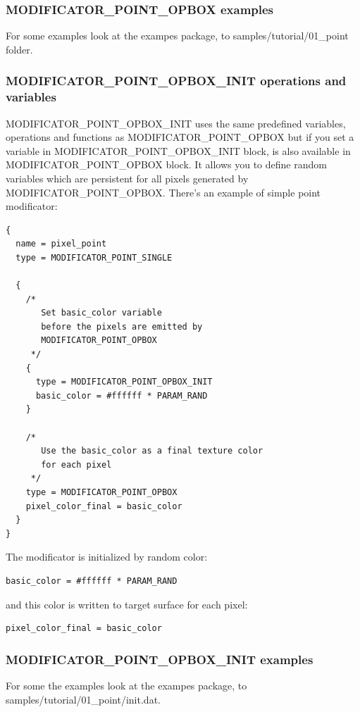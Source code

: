 \documentclass[9pt]{article}
\begin{document}
\subsubsection*{MODIFICATOR\_POINT\_OPBOX examples}

For some examples look at the exampes package, to samples/tutorial/01\_point folder.

\subsubsection*{MODIFICATOR\_POINT\_OPBOX\_INIT operations and variables}

MODIFICATOR\_POINT\_OPBOX\_INIT uses the same predefined variables, operations 
and functions as MODIFICATOR\_POINT\_OPBOX but if you set a variable in 
MODIFICATOR\_POINT\_OPBOX\_INIT block, is also available in 
MODIFICATOR\_POINT\_OPBOX block. It allows you to define random 
variables which are persistent for all pixels generated by MODIFICATOR\_POINT\_OPBOX. 
There's an example of simple point modificator:

\begin{verbatim}
{
  name = pixel_point
  type = MODIFICATOR_POINT_SINGLE

  {
    /*
       Set basic_color variable
       before the pixels are emitted by 
       MODIFICATOR_POINT_OPBOX
     */
    {
      type = MODIFICATOR_POINT_OPBOX_INIT
      basic_color = #ffffff * PARAM_RAND
    }

    /*
       Use the basic_color as a final texture color
       for each pixel
     */
    type = MODIFICATOR_POINT_OPBOX
    pixel_color_final = basic_color
  }
}
\end{verbatim}

The modificator is initialized by random color:
\begin{verbatim}
basic_color = #ffffff * PARAM_RAND
\end{verbatim}
and this color is written to target surface for each pixel:
\begin{verbatim}
pixel_color_final = basic_color
\end{verbatim}

\subsubsection*{MODIFICATOR\_POINT\_OPBOX\_INIT examples}

For some the examples look at the exampes package, to samples/tutorial/01\_point/init.dat.
\end{document}
